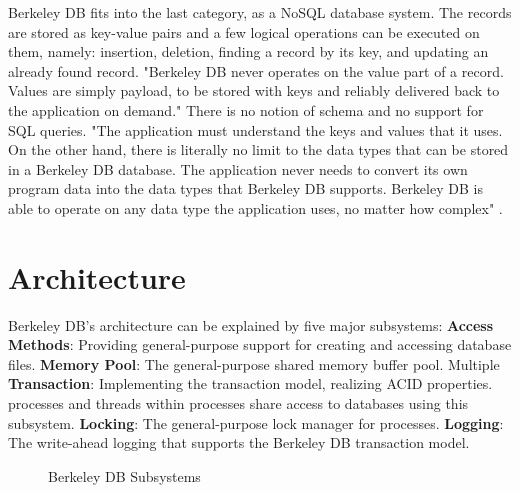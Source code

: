 \documentclass[9pt,twocolumn,twoside]{../../styles/osajnl}
\begin{document}
Berkeley DB fits into the last category, as a NoSQL database system. The records are stored 
as key-value pairs and a few logical operations can be executed on them, namely:
insertion, deletion, finding a record by its key, and updating an already found record. 
"Berkeley DB never operates on the value part of a record. Values are simply payload, 
to be stored with keys and reliably delivered back to the application on demand." 
There is no notion of schema and no support for SQL queries. "The application must 
understand the keys and values that it uses. On the other hand, there is literally 
no limit to the data types that can be stored in a Berkeley DB database. The application 
never needs to convert its own program data into the data types that Berkeley DB supports. 
Berkeley DB is able to operate on any data type the application uses, no matter how complex"
\cite{stanford-dbisnot}.

\section{Architecture}

Berkeley DB's architecture can be explained by five major subsystems: 
\textbf{Access Methods}: Providing general-purpose support for creating and accessing database files.
\textbf{Memory Pool}: The general-purpose shared memory buffer pool. Multiple 
\textbf{Transaction}: Implementing the transaction model, realizing ACID properties.
processes and threads within processes share access to databases using this subsystem.
\textbf{Locking}: The general-purpose lock manager for processes.
\textbf{Logging}: The write-ahead logging that supports the Berkeley DB transaction model.

\begin{figure}[htbp]
\centering
{}
\caption{Berkeley DB Subsystems \cite{stanford-bigpic}}
\label{fig:subsystems}
\end{figure}
\end{document}
